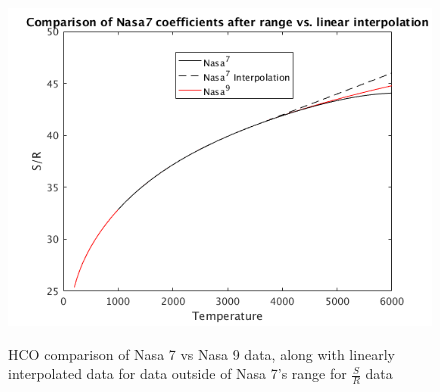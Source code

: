 \documentclass{article}
\begin{document}
\begin{figure}
  \centering
  \includegraphics[width=.8\linewidth]{./NasaPlots/ST.png}
  \label{fig:sT}
  \caption{HCO comparison of Nasa 7 vs Nasa 9 data, along with linearly interpolated data for data outside of Nasa 7's range for $\frac{S}{R}$ data}
\end{figure}

\newpage






\nocite{*}
\end{document}
